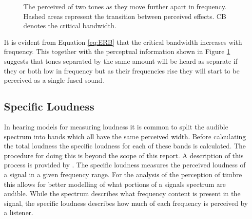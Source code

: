 		\begin{figure}[h!]
			\centering
			\caption{The perceived of two tones as they move further apart in frequency. Hashed areas represent
				 the transition between perceived effects. CB denotes the critical bandwidth.}
			\label{fig:ToneSeparation}
		\end{figure}

		It is evident from Equation \ref{eq:ERB} that the critical bandwidth increases with frequency. This
		together with the perceptual information shown in Figure \ref{fig:ToneSeparation} suggests that tones
		separated by the same amount will be heard as separate if they or both low in frequency but as their
		frequencies rise they will start to be perceived as a single fused sound.

	\subsection{Specific Loudness}
	\label{sec:Timbre-PsychoacousticPrinciples-SpecificLoudness}
		In hearing models for measuring loudness it is common to split the audible spectrum into bands which all
		have the same perceived width. Before calculating the total loudness the specific loudness for each of
		these bands is calculated. The procedure for doing this is beyond the scope of this report. A description
		of this process is provided by \citet{moore1997a}. The specific loudness measures the perceived loudness of
		a signal in a given frequency range. For the analysis of the perception of timbre this allows for better
		modelling of what portions of a signals spectrum are audible. While the spectrum describes what frequency
		content is present in the signal, the specific loudness describes how much of each frequency is perceived
		by a listener.

